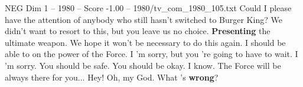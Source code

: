 \begin{textsample}{NEG Dim 1 – 1980 – Score -1.00 – 1980/tv\_com\_1980\_105.txt}  \label{ex:f1_neg_055}
Could I please have the attention of anybody who still hasn't switched to Burger King?
We didn't want to resort to this, but you leave us no choice. \textbf{Presenting} the ultimate weapon.
We hope it won't be necessary to do this again.
I should be able to on the power of the Force.
I 'm sorry, but you 're going to have to wait.
I 'm sorry.
You should be safe.
You should be okay.
I know.
The Force will be always there for you...
Hey!
Oh, my God.
What 's \textbf{wrong}?

\end{textsample}
